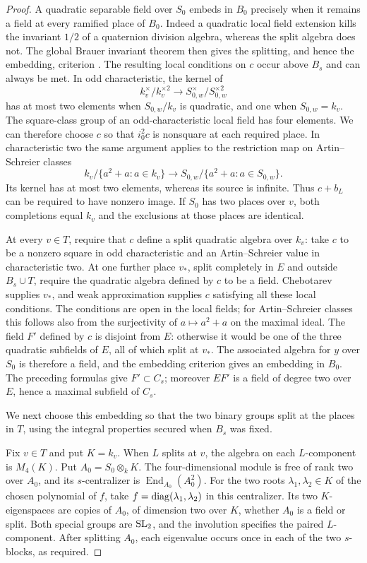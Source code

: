 \begin{proof}
A quadratic separable field over $S_0$ embeds in $B_0$ precisely
when it remains a field at every ramified place of $B_0$.
Indeed a quadratic local field extension kills the invariant
$1/2$ of a quaternion division algebra, whereas the split algebra
does not.  The global Brauer invariant theorem then gives the
splitting, and hence the embedding, criterion
\cite{Reiner,MilneCFT}.
The resulting local conditions on $c$ occur above $B_s$ and
can always be met.
In odd characteristic, the kernel of
\[
 k_v^\times/k_v^{\times2}
 \longrightarrow S_{0,w}^\times/S_{0,w}^{\times2}
\]
has at most two elements when $S_{0,w}/k_v$ is quadratic,
and one when $S_{0,w}=k_v$.  The square-class group of an
odd-characteristic local field has four elements.  We can therefore
choose $c$ so that $i_0^2c$ is nonsquare at each required place.
In characteristic two the same argument applies to the restriction
map on Artin--Schreier classes
\[
 k_v/\{a^2+a:a\in k_v\}
 \longrightarrow
 S_{0,w}/\{a^2+a:a\in S_{0,w}\}.
\]
Its kernel has at most two elements, whereas its source is infinite.
Thus $c+b_L$ can be required to have nonzero image.
If $S_0$ has two places over $v$, both completions equal $k_v$
and the exclusions at those places are identical.

At every $v\in T$, require that $c$ define a split quadratic
algebra over $k_v$: take $c$ to be a nonzero square in odd
characteristic and an Artin--Schreier value in characteristic two.
At one further place $v_*$, split completely in $E$ and outside
$B_s\cup T$, require the quadratic algebra defined by $c$ to be
a field.  Chebotarev supplies $v_*$, and weak approximation supplies
$c$ satisfying all these local conditions.  The conditions are
open in the local fields; for Artin--Schreier classes this follows
also from the surjectivity of $a\mapsto a^2+a$ on the maximal
ideal.  The field $F'$ defined by $c$ is disjoint from $E$:
otherwise it would be one of the three quadratic subfields of
$E$, all of which split at $v_*$.
The associated algebra for $y$ over $S_0$ is therefore a field,
and the embedding criterion gives an embedding in $B_0$.
The preceding formulas give $F'\subset C_s$; moreover $EF'$ is
a field of degree two over $E$, hence a maximal subfield of $C_s$.

We next choose this embedding so that the two binary groups split
at the places in $T$, using the integral properties secured when
$B_s$ was fixed.

Fix $v\in T$ and put $K=k_v$.  When $L$ splits at $v$, the algebra
on each $L$-component is $M_4(K)$.  Put $A_0=S_0\otimes_kK$.
The four-dimensional module is free of rank two over $A_0$,
and its $s$-centralizer is $\operatorname{End}_{A_0}(A_0^2)$.
For the two roots $\lambda_1,\lambda_2\in K$ of the chosen
polynomial of $f$, take $f=\operatorname{diag}(\lambda_1,\lambda_2)$ in
this centralizer.  Its two $K$-eigenspaces are copies of $A_0$,
of dimension two over $K$, whether $A_0$ is a field or split.
Both special groups are $\operatorname{SL}_2$, and the involution specifies
the paired $L$-component.  After splitting $A_0$, each eigenvalue
occurs once in each of the two $s$-blocks, as required.


\end{proof}
